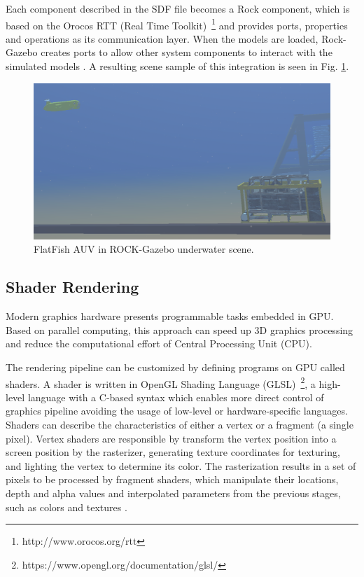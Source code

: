 \documentclass[final,5p,times]{elsarticle}
\begin{document}
Each component described in the SDF file becomes a Rock component, which is based on the Orocos RTT (Real Time Toolkit)~\footnote{http://www.orocos.org/rtt} and provides ports, properties and operations as its communication layer. When the models are loaded, Rock-Gazebo creates ports to allow other system components to interact with the simulated models \cite{cerqueira2016}. A resulting scene sample of this integration is seen in Fig. \ref{fig:uwscene}.

\begin{figure}[!h]
    \includegraphics[width=\columnwidth]{figs/uwscene2}
    \centering
    \captionsetup{justification=centering}
    \caption{FlatFish AUV in ROCK-Gazebo underwater scene.}
    \label{fig:uwscene}
\end{figure}


\subsection{Shader Rendering}
\label{dev:shader}

Modern graphics hardware presents programmable tasks embedded in GPU. Based on parallel computing, this approach can speed up 3D graphics processing and reduce the computational effort of Central Processing Unit (CPU).

The rendering pipeline can be customized by defining programs on GPU called shaders. A shader is written in OpenGL Shading Language (GLSL)~\footnote{https://www.opengl.org/documentation/glsl/}, a high-level language with a C-based syntax which enables more direct control of graphics pipeline avoiding the usage of low-level or hardware-specific languages. Shaders can describe the characteristics of either a vertex or a fragment (a single pixel). Vertex shaders are responsible by transform the vertex position into a screen position by the rasterizer, generating texture coordinates for texturing, and lighting the vertex to determine its color. The rasterization results in a set of pixels to be processed by fragment shaders, which manipulate their locations, depth and alpha values and interpolated parameters from the previous stages, such as colors and textures \cite{fernando2003}.
\end{document}
